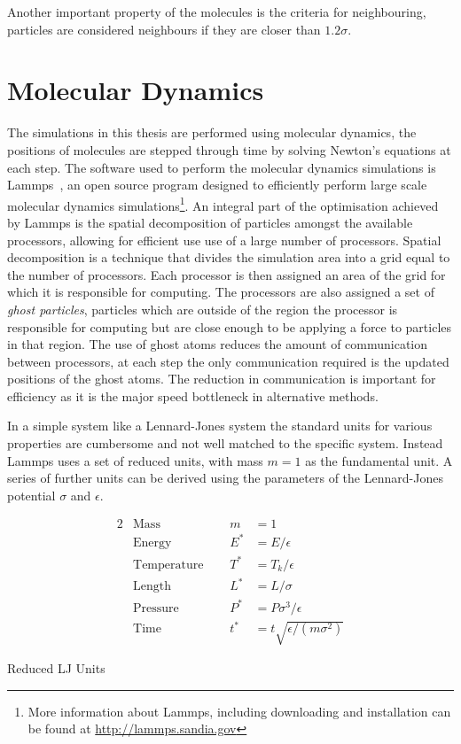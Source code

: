 Another important property of the molecules is the criteria for neighbouring, particles are considered neighbours if they are closer than $1.2\sigma$.



\section{Molecular Dynamics}

The simulations in this thesis are performed using molecular dynamics, the positions of molecules are stepped through time by solving Newton's equations at each step. The software used to perform the molecular dynamics simulations is Lammps~\cite{plimpton:95b}, an open source program designed to efficiently perform large scale molecular dynamics simulations\footnote{More information about Lammps, including downloading and installation can be found at \href{http://lammps.sandia.gov}{http://lammps.sandia.gov}}. An integral part of the optimisation achieved by Lammps is the spatial decomposition of particles amongst the available processors, allowing for efficient use use of a large number of processors. Spatial decomposition is a technique that divides the simulation area into a grid equal to the number of processors. Each processor is then assigned an area of the grid for which it is responsible for computing. The processors are also assigned a set of \emph{ghost particles}, particles which are outside of the region the processor is responsible for computing but are close enough to be applying a force to particles in that region. The use of ghost atoms reduces the amount of communication between processors, at each step the only communication required is the updated positions of the ghost atoms. The reduction in communication is important for efficiency as it is the major speed bottleneck in alternative methods.

In a simple system like a Lennard-Jones system the standard units for various properties are cumbersome and not well matched to the specific system. Instead Lammps uses a set of reduced units, with mass $m = 1$ as the fundamental unit. A series of further units can be derived using the parameters of the Lennard-Jones potential $\sigma$ and $\epsilon$. 

\begin{table}
    \centering
    \begin{alignat*}{2}
        &\text{Mass} & m &= 1 \\
        &\text{Energy} & E^* &= E/\epsilon \\
        &\text{Temperature  }\quad& T^* &= T_k/\epsilon \\
        &\text{Length} & L^* &= L/\sigma \\
        &\text{Pressure} & P^* &= P\sigma^3/\epsilon \\
        &\text{Time} & t^* &= t\sqrt{\epsilon/(m\sigma^2)}
    \end{alignat*}
    \caption{Reduced LJ Units}
    \label{tab:reduced units}
\end{table}


